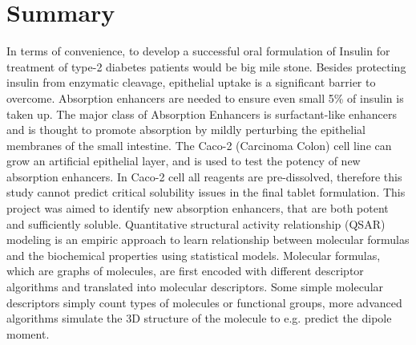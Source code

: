 \chapter{Summary}
In terms of convenience, to develop a successful oral formulation of Insulin for treatment of type-2 diabetes patients would be big mile stone. Besides protecting insulin from enzymatic cleavage, epithelial uptake is a significant barrier to overcome. Absorption enhancers are needed to ensure even small 5\% of insulin is taken up. The major class of Absorption Enhancers is surfactant-like enhancers and is thought to promote absorption by mildly perturbing the epithelial membranes of the small intestine. The Caco-2 (Carcinoma Colon) cell line can grow an artificial epithelial layer, and is used to test the potency of new absorption enhancers. In Caco-2 cell all reagents are pre-dissolved, therefore this study cannot predict critical solubility issues in the final tablet formulation. This project was aimed to identify new absorption enhancers, that are both potent and sufficiently soluble. Quantitative structural activity relationship (QSAR) modeling is an empiric approach to learn relationship between molecular formulas and the biochemical properties using statistical models. Molecular formulas, which are graphs of molecules, are first encoded with different descriptor algorithms and translated into molecular descriptors. Some simple molecular descriptors simply count types of molecules or functional groups, more advanced algorithms simulate the 3D structure of the molecule to e.g. predict the dipole moment.
